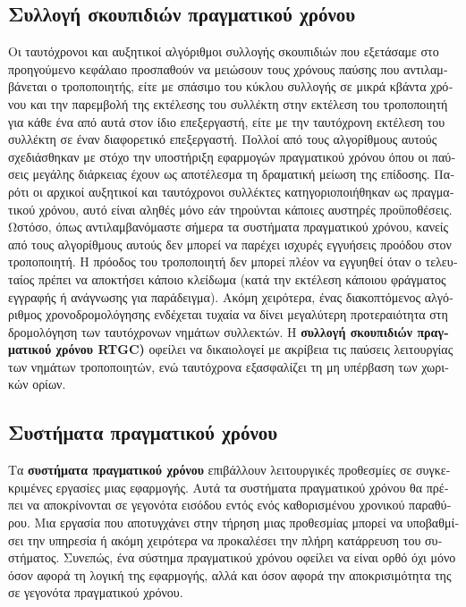 \begin{greek}
\chapter{Συλλογή σκουπιδιών πραγματικού χρόνου}\label{ch:rt}
Οι ταυτόχρονοι και αυξητικοί αλγόριθμοι συλλογής σκουπιδιών
που εξετάσαμε στο προηγούμενο κεφάλαιο προσπαθούν να μειώσουν
τους χρόνους παύσης που αντιλαμβάνεται ο τροποποιητής, είτε
με σπάσιμο του κύκλου συλλογής σε μικρά κβάντα χρόνου και την
παρεμβολή της εκτέλεσης του συλλέκτη στην εκτέλεση του τροποποιητή
για κάθε ένα από αυτά στον ίδιο επεξεργαστή, είτε με την ταυτόχρονη
εκτέλεση του συλλέκτη σε έναν διαφορετικό επεξεργαστή. Πολλοί
από τους αλγορίθμους αυτούς σχεδιάσθηκαν με στόχο την υποστήριξη
εφαρμογών πραγματικού χρόνου όπου οι παύσεις μεγάλης διάρκειας
έχουν ως αποτέλεσμα τη δραματική μείωση της επίδοσης. Παρότι
οι αρχικοί αυξητικοί και ταυτόχρονοι συλλέκτες κατηγοριοποιήθηκαν
ως πραγματικού χρόνου, αυτό είναι αληθές μόνο εάν τηρούνται
κάποιες αυστηρές προϋποθέσεις. Ωστόσο, όπως αντιλαμβανόμαστε
σήμερα τα συστήματα πραγματικού χρόνου, κανείς από τους αλγορίθμους
αυτούς δεν μπορεί να παρέχει ισχυρές εγγυήσεις προόδου στον
τροποποιητή. Η πρόοδος του τροποποιητή δεν μπορεί πλέον να
εγγυηθεί όταν ο τελευταίος πρέπει να αποκτήσει κάποιο κλείδωμα
(κατά την εκτέλεση κάποιου φράγματος εγγραφής ή ανάγνωσης για
παράδειγμα). Ακόμη χειρότερα, ένας διακοπτόμενος αλγόριθμος χρονοδρομολόγησης
ενδέχεται τυχαία να δίνει μεγαλύτερη προτεραιότητα στη δρομολόγηση
των ταυτόχρονων νημάτων συλλεκτών. Η \textbf{συλλογή σκουπιδιών
πραγματικού χρόνου RTGC)} οφείλει να δικαιολογεί με ακρίβεια
τις παύσεις λειτουργίας των νημάτων τροποποιητών, ενώ ταυτόχρονα
εξασφαλίζει τη μη υπέρβαση των χωρικών ορίων.

\section{Συστήματα πραγματικού χρόνου}
Τα \textbf{συστήματα πραγματικού χρόνου} επιβάλλουν λειτουργικές
προθεσμίες σε συγκεκριμένες εργασίες μιας εφαρμογής. Αυτά τα
συστήματα πραγματικού χρόνου θα πρέπει να αποκρίνονται σε
γεγονότα εισόδου εντός ενός καθορισμένου χρονικού παραθύρου.
Μια εργασία που αποτυγχάνει στην τήρηση μιας προθεσμίας μπορεί
να υποβαθμίσει την υπηρεσία ή ακόμη χειρότερα να προκαλέσει
την πλήρη κατάρρευση του συστήματος. Συνεπώς, ένα σύστημα
πραγματικού χρόνου οφείλει να είναι ορθό όχι μόνο όσον αφορά
τη λογική της εφαρμογής, αλλά και όσον αφορά την αποκρισιμότητα
της σε γεγονότα πραγματικού χρόνου.


\end{greek}
